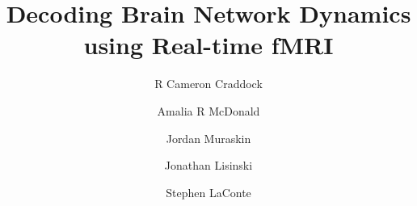 
\title{Decoding Brain Network Dynamics using Real-time fMRI}


\author[aff1,aff2]{{R Cameron} Craddock}
\author[aff1]{Amalia R McDonald}
\author[aff1]{Jordan Muraskin}
\author[aff3]{Jonathan Lisinski}
\author[aff3,aff4,aff5]{Stephen LaConte}


\address[aff1]{Nathan Kline Institute for Psychiatric Research, Orangeburg, NY, USA }
\address[aff2]{Child Mind Institute, New York, NY, USA }
\address[aff3]{Virginia Tech Carilion Research Institute, Roanoke, VA, USA }
\address[aff4]{School of Biomedical Engineering and Sciences, Virginia Polytechnic Institute and State University, Blacksburg, VA, USA }  
\address[aff5]{Departments of Emergency Medicine and Emergency Radiology, Virginia Tech Carilion School of Medicine, Roanoke, VA, USA }  

